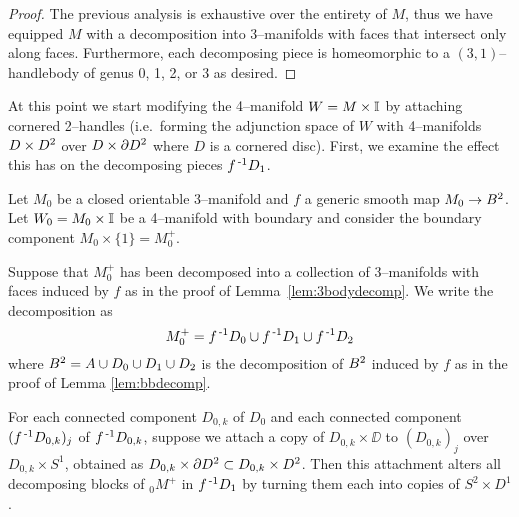 \begin{proof}
	The previous analysis is exhaustive over the entirety of $M$, thus we have equipped $M$ with a decomposition into 3--manifolds with faces that intersect only along faces.
	Furthermore, each decomposing piece is homeomorphic to a $(3,1)$--handlebody of genus 0, 1, 2, or 3 as desired.
\end{proof}

At this point we start modifying the 4--manifold $W=M \times \mathbb{I}$ by attaching cornered 2--handles (i.e.\ forming the adjunction space of $W$ with 4--manifolds $D\times D^2$ over $D\times\partial D^2$ where $D$ is a cornered disc).
First, we examine the effect this has on the decomposing pieces $f^{\,\text{-}1} D_1$.

\begin{lem}
	\label{lem:3body2handlept1}
	Let $M_0$ be a closed orientable 3--manifold and $f$ a generic smooth map $M_0\to B^2$.
	Let $W_0=M_0\times\mathbb{I}$ be a 4--manifold with boundary and consider the boundary component $M_0\times\{1\}=M_0^+$.
	
	Suppose that $M_0^+$ has been decomposed into a collection of 3--manifolds with faces induced by $f$ as in the proof of Lemma~\ref{lem:3bodydecomp}.
	We write the decomposition as
	\[
		M_0^+ = f^{\,\text{-}1} D_0\cup f^{\,\text{-}1} D_1\cup f^{\,\text{-}1} D_2
	\]
	where $B^2=A\cup D_0\cup D_1\cup D_2$ is the decomposition of $B^2$ induced by $f$ as in the proof of Lemma \ref{lem:bbdecomp}.
	
	For each connected component $D_{0,k}$ of $D_0$ and each connected component $(f^{\,\text{-}1} D_{0,k})_j$ of $f^{\,\text{-}1} D_{0,k}$, suppose we attach a copy of $D_{0,k}\times\DD$ to $(D_{0,k})_j$ over $D_{0,k}\times S^1$, obtained as $D_{0,k}\times \partial D^2\subset D_{0,k}\times D^2$.
	Then this attachment alters all decomposing blocks of $_0M^+$ in $f^{\,\text{-}1} D_1$ by turning them each into copies of $S^2\times D^1$.

\end{lem}


